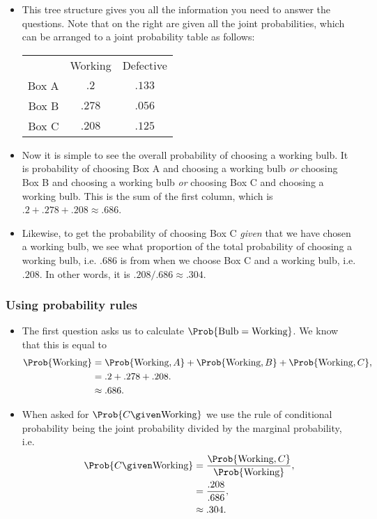 \documentclass{slides}
\begin{document}
\begin{frame}
	\begin{itemize}
	\item This tree structure gives you all the information you need to answer the questions. Note that on the right are given all the joint probabilities, which can be arranged to a joint probability table as follows:
\begin{center}
\begin{tabular}{rcc}
& Working & Defective \\
Box A & $.2$ & $.133$ \\
Box B & $.278$ & $.056$ \\
Box C & $.208$ & $.125$
\end{tabular}
\end{center}
\item Now it is simple to see the overall probability of choosing a working bulb. It is probability of choosing Box A and choosing a working bulb \emph{or} choosing Box B and choosing a working bulb \emph{or} choosing Box C and choosing a working bulb. This is the sum of the first column, which is $.2+.278+.208\approx.686$. 
\item Likewise, to get the probability of choosing Box C \emph{given} that we have chosen a working bulb, we see what proportion of the total probability of choosing a working bulb, i.e. $.686$ is from when we choose Box C and a working bulb, i.e. $.208$. In other words, it is $.208/.686\approx .304$. 
%
\end{itemize}
\end{frame}

\begin{frame}
	\frametitle{Using probability rules}
	\begin{itemize}
	\item The first question asks us to calculate $\Prob{\text{Bulb}=\text{Working}}$. We know that this is equal to 
\begin{align*}
\Prob{\text{Working}} &= \Prob{\text{Working},A} + \Prob{\text{Working}, B} + \Prob{\text{Working},C},\\
&= .2 + .278 + .208.\\
&\approx .686.
\end{align*}
\item When asked for $\Prob{C\given\text{Working}}$ we use the rule of conditional probability being the joint probability divided by the marginal probability, i.e. 
\begin{align*}
\Prob{C\given\text{Working}} &= \frac{\Prob{\text{Working},C}}{\Prob{\text{Working}}},\\
&= \frac{.208}{.686},\\
&\approx .304.
\end{align*}

	\end{itemize}
\end{frame}
\end{document}
